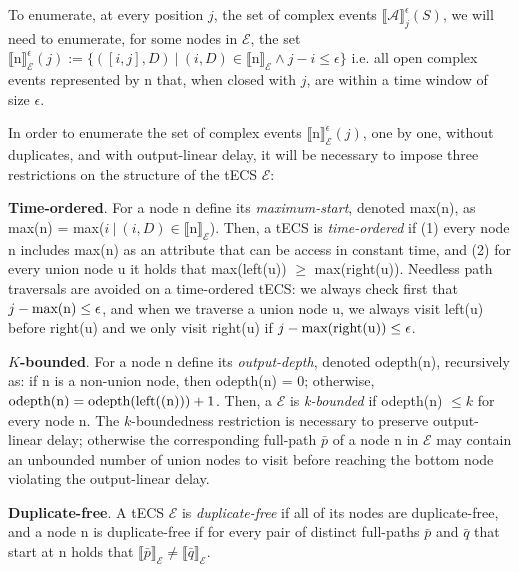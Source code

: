 To enumerate, at every position $j$, the set of complex events ${\llbracket \mathcal{A} \rrbracket}^{\epsilon}_{j}(S)$, we will need to enumerate, for some nodes in $\mathcal{E}$, the set ${\llbracket \textrm{n} \rrbracket}^{\epsilon}_{\mathcal{E}}(j) := \{ ([i, j], D) \ | \ (i, D) \in {\llbracket \textrm{n} \rrbracket}_{\mathcal{E}} \land j - i \leq \epsilon \}$ i.e. all open complex events represented by \textrm{n} that, when closed with $j$, are within a time window of size $\epsilon$.

In order to enumerate the set of complex events ${\llbracket \textrm{n} \rrbracket}^{\epsilon}_{\mathcal{E}}(j)$, one by one, without duplicates, and with output-linear delay, it will be necessary to impose three restrictions on the structure of the tECS $\mathcal{E}$:

\textbf{Time-ordered}. For a node \textrm{n} define its \emph{maximum-start}, denoted max(\textrm{n}), as max(\textrm{n}) = max(${ i \ | \ (i, D) \in {\llbracket \textrm{n} \rrbracket}_{\mathcal{E}}}$). Then, a tECS is \emph{time-ordered} if (1) every node \textrm{n} includes max(\textrm{n}) as an attribute that can be access in constant time, and (2) for every union node \textrm{u} it holds that max(left(\textrm{u})) $\ge$ max(right(\textrm{u})). Needless path traversals are avoided on a time-ordered tECS: we always check first that $j - \text{max({\textrm{n}})} \le \epsilon$, and when we traverse a union node \textrm{u}, we always visit left(\textrm{u}) before right(\textrm{u}) and we only visit right(\textrm{u}) if $j - \text{max(right(\textrm{u}))} \le \epsilon$.

\textbf{$K$-bounded}. For a node \textrm{n} define its \emph{output-depth}, denoted odepth(\textrm{n}), recursively as: if \textrm{n} is a non-union node, then odepth(\textrm{n}) = 0; otherwise, $\text{odepth(\textrm{n})} = \text{odepth(left(\textrm(n)))} + 1$. Then, a $\mathcal{E}$ is \emph{k-bounded} if odepth(\textrm{n}) $\leq k$ for every node \textrm{n}. The $k$-boundedness restriction is necessary to preserve output-linear delay; otherwise the corresponding full-path $\bar{p}$ of a node \textrm{n} in $\mathcal{E}$ may contain an unbounded number of union nodes to visit before reaching the bottom node violating the output-linear delay.

\textbf{Duplicate-free}. A tECS $\mathcal{E}$ is \emph{duplicate-free} if all of its nodes are duplicate-free, and a node \textrm{n} is duplicate-free if for every pair of distinct full-paths $\bar{p}$ and $\bar{q}$ that start at \textrm{n} holds that ${\llbracket \bar{p} \rrbracket}_{\mathcal{E}} \ne {\llbracket \bar{q} \rrbracket}_{\mathcal{E}}$.

